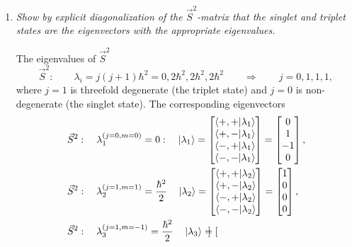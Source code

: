 \begin{example}
\begin{enumerate}
		\item \emph{Show by explicit diagonalization of the $\vec{S}^2$-matrix that the singlet and triplet states are the eigenvectors with the appropriate eigenvalues.}\newline
		
		The eigenvalues of $\vec{S}^2$
		\begin{equation}
			\vec{S}^2:\qquad \lambda_i=j(j+1)\hbar^2=0,2\hbar^2,2\hbar^2,2\hbar^2 \qquad \Rightarrow \qquad j=0,1,1,1,
		\end{equation} 
		where $j=1$ is threefold degenerate (the triplet state) and $j=0$ is non-degenerate (the singlet state). The corresponding eigenvectors
		\begin{equation}
			\begin{split}
				&\vec{S}^2: \quad\lambda_1^{(j=0,m=0)}=0: \quad   \ket{\lambda_1}=\begin{bmatrix}
					\braket{+,+|\lambda_1} \\
					\braket{+,-|\lambda_1} \\
					\braket{-,+|\lambda_1} \\
					\braket{-,-|\lambda_1} \\
				\end{bmatrix}=\begin{bmatrix}
					0 \\
					1 \\
					-1 \\
					0 \\
				\end{bmatrix},\\
				&\vec{S}^2:\quad \lambda_2^{(j=1,m=1)}=\frac{\hbar^2}{2} \quad \ket{\lambda_2}=\begin{bmatrix}
					\braket{+,+|\lambda_2} \\
					\braket{+,-|\lambda_2} \\
					\braket{-,+|\lambda_2} \\
					\braket{-,-|\lambda_2} \\
				\end{bmatrix}=\begin{bmatrix}
					1 \\
					0 \\
					0 \\
					0 \\
				\end{bmatrix},\\
				&\vec{S}^2: \quad\lambda_3^{(j=1,m=-1)}=\frac{\hbar^2}{2}  \quad \ket{\lambda_3}=\begin{bmatrix}

\end{bmatrix}
\end{split}
\end{equation}
\end{enumerate}
\end{example}
